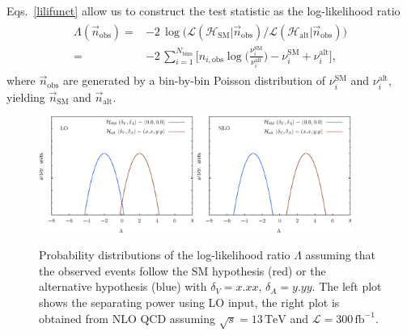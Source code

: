 \documentclass[preprint]{JHEP3} %
\newcommand{\mrm}{\mathrm}
\newcommand{\TeV}{\mathrm{TeV}}
\newcommand{\SM}{\mathrm{SM}}
\newcommand{\alt}{\mathrm{alt}}
\def\invfb {\mathrm{fb}^{-1}}
\def\HSM{\mathcal{H}_{\mathrm{SM}}}
\def\Halt{\mathcal{H}_{\mathrm{alt}}}
\newcommand{\be}{\begin{eqnarray}}
\newcommand{\ee}{\end{eqnarray}}
\begin{document}
Eqs.~\ref{lilifunct} allow us to construct the test statistic as the log-likelihood ratio
\be
\begin{split}
  \Lambda(\vec{n}_\mathrm{obs}) =& -2 \, \log \biggl( \mathcal{L}(\HSM |\vec{n}_\mathrm{obs})  \big/ \mathcal{L}(\Halt|\vec{n}_\mathrm{obs})  \biggr)  \\
                                =& -2\, \sum_{i=1}^{N_\mathrm{bins}} \biggl[ n_{i,\mathrm{obs}}\log \biggl( \frac{\nu_i^{\SM}}{\nu_i^{\alt}} \biggr) -\nu_i^{\SM} + \nu_i^{\alt} \biggr],
\end{split}
\ee
where $\vec{n}_{\mrm{obs}}$ are generated by a bin-by-bin Poisson distribution of $\nu_i^{\SM}$ and $\nu_i^{\alt}$, yielding $\vec{n}_{\SM}$ and $\vec{n}_{\alt}$.

\begin{figure}[t]
\centering %
\includegraphics[width=0.45\textwidth]{./LogLikelihoods_LO.eps}
\hfill
\includegraphics[width=0.45\textwidth]{./LogLikelihoods_NLO.eps}\caption{\label{fig:vi}
Probability distributions of the log-likelihood ratio $\Lambda$ assuming that the observed events follow the SM hypothesis (red) or the alternative hypothesis (blue) 
with $\delta_V=x.xx$, $\delta_A=y.yy$. The left plot shows the separating power using LO input, the right plot is obtained from NLO QCD assuming $\sqrt{s}=13\,\TeV$ and $\mathcal{L}=300\,\invfb$.
}
\end{figure}
\end{document}
